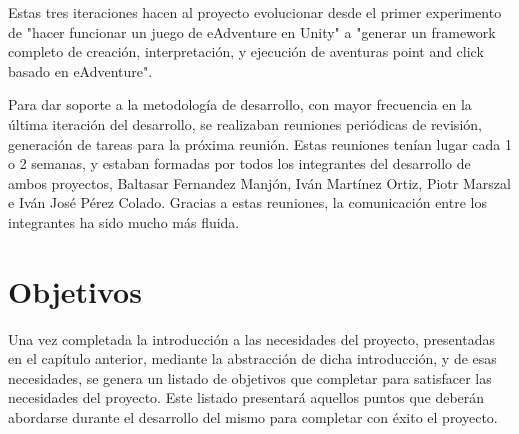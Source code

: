 Estas tres iteraciones hacen al proyecto evolucionar desde el primer experimento de "hacer funcionar un juego de eAdventure en Unity" a "generar un framework completo de creación, interpretación, y ejecución de aventuras point and click basado en eAdventure". 

Para dar soporte a la metodología de desarrollo, con mayor frecuencia en la última iteración del desarrollo, se realizaban reuniones periódicas de revisión, generación de tareas para la próxima reunión. Estas reuniones tenían lugar cada 1 o 2 semanas, y estaban formadas por todos los integrantes del desarrollo de ambos proyectos, Baltasar Fernandez Manjón, Iván Martínez Ortiz, Piotr Marszal e Iván José Pérez Colado. Gracias a estas reuniones, la comunicación entre los integrantes ha sido mucho más fluida.

\chapter{Objetivos}
\label{objetivos}

Una vez completada la introducción a las necesidades del proyecto, presentadas en el capítulo anterior, mediante la abstracción de dicha introducción, y de esas necesidades, se genera un listado de objetivos que completar para satisfacer las necesidades del proyecto. Este listado presentará aquellos puntos que deberán abordarse durante el desarrollo del mismo para completar con éxito el proyecto.

